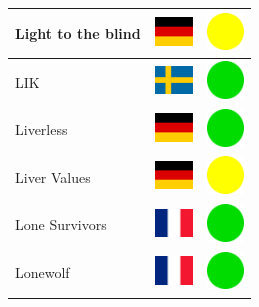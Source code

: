\documentclass[12pt, a4paper, twoside]{report}
\begin{document}
\begin{center}
\begin{longtable}{|p{5cm}|p{2cm}|p{2cm}|}
 Light to the blind                                         & \includegraphics[width=1cm]{../4x3/de} &   \includegraphics[width=1cm]{../likes/m} \\ \hline
 LIK                                                        & \includegraphics[width=1cm]{../4x3/se} &   \includegraphics[width=1cm]{../likes/y} \\ \hline
 Liverless                                                  & \includegraphics[width=1cm]{../4x3/de} &   \includegraphics[width=1cm]{../likes/y} \\ \hline
 Liver Values                                               & \includegraphics[width=1cm]{../4x3/de} &   \includegraphics[width=1cm]{../likes/m} \\ \hline
 Lone Survivors                                             & \includegraphics[width=1cm]{../4x3/fr} &   \includegraphics[width=1cm]{../likes/y} \\ \hline
 Lonewolf                                                   & \includegraphics[width=1cm]{../4x3/fr} &   \includegraphics[width=1cm]{../likes/y} \\ \hline

\end{longtable}
\end{center}
\end{document}
